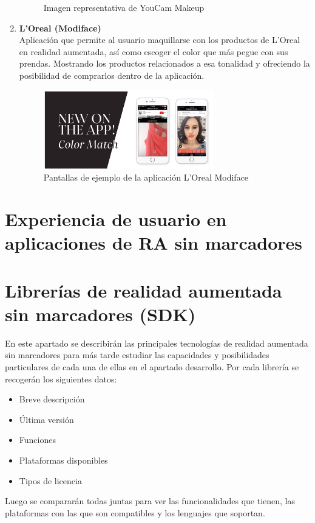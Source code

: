 \begin{enumerate}
\begin{figure}[H]
    \caption{Imagen representativa de YouCam Makeup}
    \label{fig:YouCam}
\end{figure}
\item \textbf{L’Oreal (Modiface)}\\
Aplicación que permite al usuario maquillarse con los productos de L’Oreal en realidad aumentada, así como escoger el color que más pegue con sus prendas. Mostrando los productos relacionados a esa tonalidad y ofreciendo la posibilidad de comprarlos dentro de la aplicación.
\begin{figure}[H]
    \centering
    \includegraphics[width=0.7\textwidth]{Images/Loreal_App.png}
    \caption{Pantallas de ejemplo de la aplicación L'Oreal Modiface}
    \label{fig:Loreal}
\end{figure}
\end{enumerate}
\section{Experiencia de usuario en aplicaciones de RA sin marcadores}
\clearpage
\section{Librerías de realidad aumentada sin marcadores (SDK)}
En este apartado se describirán las principales tecnologías de realidad aumentada sin marcadores para más tarde estudiar las capacidades y posibilidades particulares de cada una de ellas en el apartado desarrollo.
Por cada librería se recogerán los siguientes datos:
\begin{itemize}
\item Breve descripción
\item Última versión
\item Funciones
\item Plataformas disponibles
\item Tipos de licencia
\end{itemize}
Luego se compararán todas juntas para ver las funcionalidades que tienen, las plataformas con las que son compatibles y los lenguajes que soportan.
\clearpage
